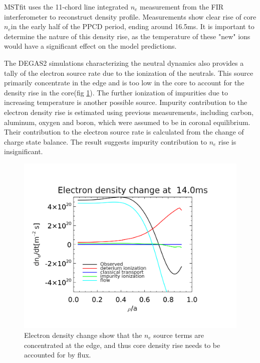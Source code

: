 \documentclass[aip, pop, preprint]{revtex4-1}
\begin{document}
MSTfit uses the 11-chord line integrated $n_e$ measurement from the FIR interferometer to reconstruct density profile. Measurements show clear rise of core $n_{e} $in the early half of the PPCD period, ending around 16.5ms. It is important to determine the nature of this density rise, as the temperature of these "new" ions would have a significant effect on the model predictions.

The DEGAS2 simulations characterizing the neutral dynamics also provides a tally of the electron source rate due to the ionization of the neutrals. This source primarily concentrate in the edge and is too low in the core to account for the density rise in the core(fig \ref{fig:ne_change}). The further ionization of impurities due to increasing temperature is another possible source. Impurity contribution to the electron density rise is estimated using previous measurements, including carbon, aluminum, oxygen and boron, which were assumed to be in coronal equilibrium. Their contribution to the electron source rate is calculated from the change of charge state balance. The result suggests impurity contribution to $n_e$ rise is insignificant.


\begin{figure}
	\centering
	\includegraphics[width=0.95\linewidth]{./plots/dndt_at14-1}	
	\caption{Electron density change show that the $n_e$ source terms are concentrated at the edge, and thus core density rise needs to be accounted for by flux.}
	\label{fig:ne_change}
\end{figure}
\end{document}
